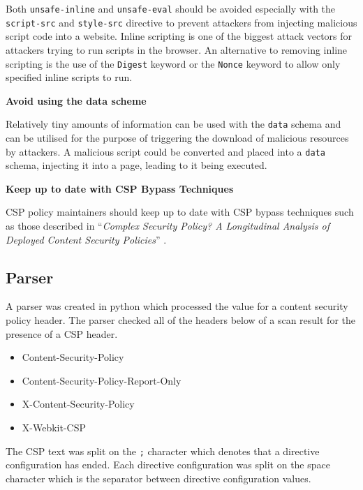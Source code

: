 \documentclass{mscreport}
\begin{document}
\vspace{0.3cm} \noindent
Both \texttt{unsafe-inline} and \texttt{unsafe-eval} should be avoided especially with the  \texttt{script-src} and \texttt{style-src} directive to prevent attackers from injecting malicious script code into a website. Inline scripting is one of the biggest attack vectors for attackers trying to run scripts in the browser. An alternative to removing inline scripting is the use of the \texttt{Digest} keyword or the \texttt{Nonce} keyword to allow only specified inline scripts to run.

\vspace{0.5cm} \noindent
\textbf{Avoid using the data scheme}

\vspace{0.3cm} \noindent
Relatively tiny amounts of information can be used with the \texttt{data} schema and can be utilised for the purpose of triggering the download of malicious resources by attackers. A malicious script could be converted and placed into a \texttt{data} schema, injecting it into a page, leading to it being executed.

\vspace{0.5cm} \noindent
\textbf{Keep up to date with CSP Bypass Techniques}

\vspace{0.3cm} \noindent
CSP policy maintainers should keep up to date with CSP bypass techniques such as those described in  ``\textit{Complex Security Policy? A Longitudinal Analysis of Deployed Content Security Policies}'' \cite{Roth2020-hg}.

\subsection{Parser}

A parser was created in python which processed the value for a content security policy header. The parser checked all of the headers below of a scan result for the presence of a CSP header.

\begin{itemize}
	\setlength\itemsep{0.1em}
	\item Content-Security-Policy
	\item Content-Security-Policy-Report-Only
	\item X-Content-Security-Policy
	\item X-Webkit-CSP
\end{itemize}

\noindent
The CSP text was split on the \texttt{;} character which denotes that a directive configuration has ended. Each directive configuration was split on the space character which is the separator between directive configuration values.
\end{document}
